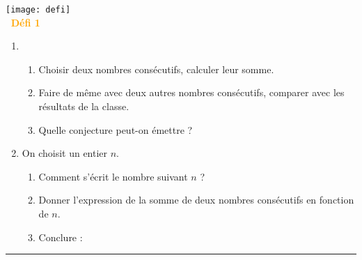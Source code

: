 \parbox{1.75cm}{\texttt{[image: defi]} \\ [5mm] \textcolor{orange}{\bf\large \, Défi 1}}
\qquad
\parbox{14.45cm}{
   \begin{enumerate}
      \item
      \begin{enumerate}
         \item Choisir deux nombres consécutifs, calculer leur somme. \\ [2mm]
            \pf \medskip
         \item Faire de même avec deux autres nombres consécutifs, comparer avec les résultats de la classe. \\ [2mm]
            \pf \medskip
         \item Quelle conjecture peut-on émettre ? \\ [2mm]
            \pf \medskip
      \end{enumerate}
      \item On choisit un entier $n$.
      \begin{enumerate}
         \item Comment s'écrit le nombre suivant $n$ ? \\ [2mm]
            \pf \medskip
         \item Donner l'expression de la somme de deux nombres consécutifs en fonction de $n$. \\  [2mm]
            \pf \medskip
         \item Conclure : \\ [2mm]
            \pf \medskip
      \end{enumerate}
   \end{enumerate}}

\hrule
\ \\ [3mm]

